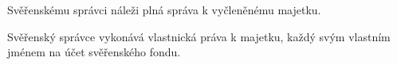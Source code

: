 \documentclass[parskip=half]{scrreprt}
\begin{document}
\begin{contract}


Svěřenskému správci náleži plná správa k vyčleněnému majetku.

Svěřenský správce vykonává vlastnická práva k majetku, každý svým vlastním jménem na účet svěřenského fondu.








\end{contract}
\end{document}
